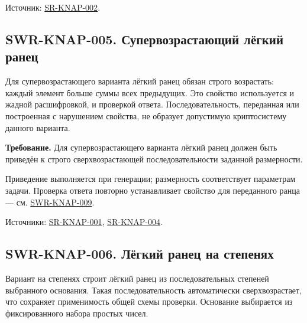 \documentclass[12pt,a4paper]{article}
\begin{document}
Источник: {\href{../04\_Системные\_требования/DOC-05\_Системные\_требования.pdf\#sr-knap-002}{SR-KNAP-002}}.

\subsection{SWR-KNAP-005. Супервозрастающий лёгкий ранец}\label{swr-knap-005-ux441ux443ux43fux435ux440ux432ux43eux437ux440ux430ux441ux442ux430ux44eux449ux438ux439-ux43bux451ux433ux43aux438ux439-ux440ux430ux43dux435ux446}

\hypertarget{swr-knap-005-супервозрастающий-лёгкий-ранец}{}

\hypertarget{swr-knap-005}{}

Для супервозрастающего варианта лёгкий ранец обязан строго возрастать: каждый элемент больше суммы всех предыдущих. Это свойство используется и жадной расшифровкой, и проверкой ответа. Последовательность, переданная или построенная с нарушением свойства, не образует допустимую криптосистему данного варианта.

\textbf{Требование.} Для супервозрастающего варианта лёгкий ранец должен быть приведён к строго сверхвозрастающей последовательности заданной размерности.

Приведение выполняется при генерации; размерность соответствует параметрам задачи. Проверка ответа повторно устанавливает свойство для переданного ранца --- см. {\hyperlink{swr-knap-009}{SWR-KNAP-009}}.

Источники: {\href{../04\_Системные\_требования/DOC-05\_Системные\_требования.pdf\#sr-knap-001}{SR-KNAP-001}}, {\href{../04\_Системные\_требования/DOC-05\_Системные\_требования.pdf\#sr-knap-004}{SR-KNAP-004}}.

\subsection{SWR-KNAP-006. Лёгкий ранец на степенях}\label{swr-knap-006-ux43bux451ux433ux43aux438ux439-ux440ux430ux43dux435ux446-ux43dux430-ux441ux442ux435ux43fux435ux43dux44fux445}

\hypertarget{swr-knap-006-лёгкий-ранец-на-степенях}{}

\hypertarget{swr-knap-006}{}

Вариант на степенях строит лёгкий ранец из последовательных степеней выбранного основания. Такая последовательность автоматически сверхвозрастает, что сохраняет применимость общей схемы проверки. Основание выбирается из фиксированного набора простых чисел.
\end{document}
